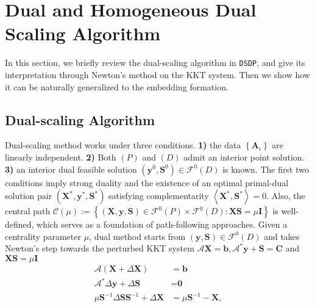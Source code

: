 \section{Dual and Homogeneous Dual Scaling Algorithm }\label{sec3}

In this section, we briefly review the dual-scaling algorithm in
{{\texttt{DSDP}}}, and give its interpretation through Newton's method on the KKT system. Then we show how it can be naturally generalized to the embedding formation.

\subsection{Dual-scaling Algorithm}

Dual-scaling method
{\cite{benson1999mixed}} works under three conditions. {\textbf{1)}} the
 data $\left\{ \mathbf{A}_i \right\}$ are linearly independent.
{\textbf{2)}} Both $(P)$ and $(D)$ admit an interior point
solution. {\textbf{3)}} an interior dual feasible solution $\left( \mathbf{y}^0,
\mathbf{S}^0 \right) \in \mathcal{F}^0 (D)$ is known. The first two conditions imply
strong duality and the existence of an optimal primal-dual solution pair $\left(
\mathbf{X}^{\ast}, \mathbf{y}^{\ast}, \mathbf{S}^{\ast} \right)$ satisfying complementarity
$\left\langle \mathbf{X}^{\ast}, \mathbf{S}^{\ast} \right\rangle = 0$. Also, the central path $\mathcal{C} (\mu) :=
\left\{ \left( \mathbf{X}, \mathbf{y}, \mathbf{S} \right) \in \mathcal{F}^0 (P) \times \mathcal{F}^0
(D) : \mathbf{X} \mathbf{S} = \mu \mathbf{I} \right\}$ is well-defined, which serves as a foundation of
path-following approaches. Given a centrality parameter $\mu$, 
dual method starts from
$\left( \mathbf{y}, \mathbf{S} \right) \in \mathcal{F}^0(D)$ and takes Newton's step towards the perturbed KKT system $\mathcal{A} \mathbf{X} = \mathbf{b},
\mathcal{A}^{\ast} \mathbf{y} + \mathbf{S} = \mathbf{C}$ and $\mathbf{X} \mathbf{S} = \mu \mathbf{I}$
\begin{align}\label{dsdpnewton}
  \mathcal{A} \left( \mathbf{X} + \Delta \mathbf{X} \right) & = \mathbf{b} \nonumber \\
  \mathcal{A}^{\ast} \Delta \mathbf{y} + \Delta \mathbf{S} & = \textbf{0} \\
  \mu \mathbf{S}^{- 1} \Delta \mathbf{S} \mathbf{S}^{- 1} + \Delta \mathbf{X} & = \mu \mathbf{S}^{- 1} - \mathbf{X} \nonumber, 
\end{align}

